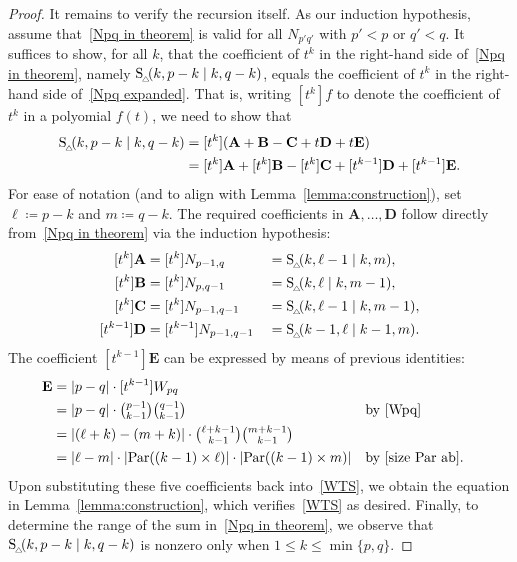 \documentclass[11pt]{amsart}
\theoremstyle{plain}
\theoremstyle{definition}
\numberwithin{equation}{section}
\newcommand{\Par}{{\rm Par}}
\newcommand{\Stri}{{\rm S}_{_{\!\triangle\!\!}}}
\begin{document}
\begin{proof}
    It remains to verify the recursion itself.
    As our induction hypothesis, assume that~\eqref{Npq in theorem} is valid for all $N_{p'q'}$ with $p' < p$ or $q' < q$.
    It suffices to show, for all $k$, that the coefficient of $t^k$ in the right-hand side of~\eqref{Npq in theorem}, namely $\Stri(k, p-k \mid k, q-k)$, equals the coefficient of $t^k$ in the right-hand side of~\eqref{Npq expanded}.
    That is, writing $[t^k] f$ to denote the coefficient of $t^k$ in a polyomial $f(t)$,
    we need to show that
    \begin{align}
        \Stri(k, p-k \mid k, q-k) &= [t^k](\mathbf{A} + \mathbf{B} - \mathbf{C} + t\mathbf{D} + t\mathbf{E}) \nonumber \\
        &= [t^k]\mathbf{A} + [t^k]\mathbf{B} - [t^k]\mathbf{C} + [t^{k-1}]\mathbf{D} + [t^{k-1}]\mathbf{E}. \label{WTS} 
    \end{align}
    For ease of notation (and to align with Lemma~\ref{lemma:construction}), set $\ell \coloneqq p-k$ and $m \coloneqq q-k$.
    The required coefficients in $\mathbf{A}, \ldots, \mathbf{D}$ follow directly from~\eqref{Npq in theorem} via the induction hypothesis:
    \begin{alignat*}{3}
        [t^k]\mathbf{A} &= [t^k]N_{p-1,q} &&=\Stri(k, \ell-1 \mid k, m),\\
        [t^k]\mathbf{B} &= [t^k]N_{p,q-1} &&= \Stri(k, \ell \mid k, m-1),\\
        [t^k]\mathbf{C} &= [t^k]N_{p-1,q-1} &&= \Stri(k, \ell-1 \mid k, m-1),\\
        [t^{k-1}]\mathbf{D} &= [t^{k-1}]N_{p-1,q-1} &&= \Stri(k-1, \ell \mid k-1, m).
    \end{alignat*}
    The coefficient $[t^{k-1}]\mathbf{E}$ can be expressed by means of previous identities:
    \begin{align*}
        [t^{k-1}]\mathbf{E} &= |p-q| \cdot [t^{k-1}]W_{pq} \\
        &= |p-q| \cdot \textstyle\binom{p-1}{k-1} \binom{q-1}{k-1} && \text{by~\eqref{Wpq}}\\
        &= |(\ell+k) - (m+k)| \cdot \textstyle\binom{\ell + k-1}{k-1} \binom{m + k-1}{k-1}\\
        &= |\ell - m| \cdot |\Par((k-1) \times \ell)| \cdot |\Par((k-1) \times m)| && \text{by~\eqref{size Par ab}}.
    \end{align*}
  Upon substituting these five coefficients back into~\eqref{WTS}, we obtain the equation in Lemma~\ref{lemma:construction}, which verifies~\eqref{WTS} as desired. 
  Finally, to determine the range of the sum in~\eqref{Npq in theorem}, we observe that $\Stri(k, p-k \mid k, q-k)$ is nonzero only when $1 \leq k \leq \min\{p,q\}$.
\end{proof}
\end{document}

